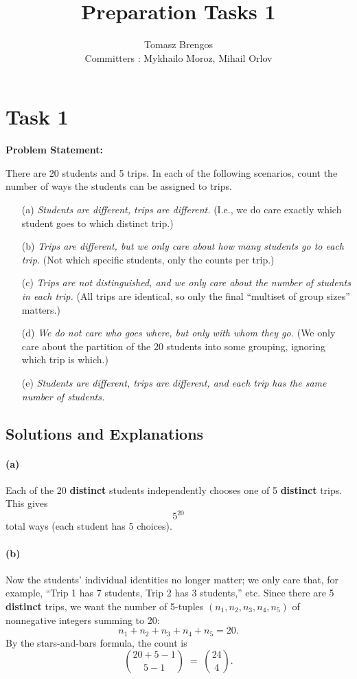 \documentclass[docmute]{article}
\title{Preparation Tasks 1}
\author{Tomasz Brengos \\  
Committers : Mykhailo Moroz, Mihail Orlov}
\date{}
\begin{document}
\maketitle

\section*{Task 1}

\textbf{Problem Statement:}

There are 20 students and 5 trips. In each of the following scenarios, count the number of ways the students can be assigned to trips.

\begin{enumerate}
  \item[(a)] \emph{Students are different, trips are different.} (I.e., we do care exactly which student goes to which distinct trip.)
  \item[(b)] \emph{Trips are different, but we only care about how many students go to each trip.} (Not which specific students, only the counts per trip.)
  \item[(c)] \emph{Trips are not distinguished, and we only care about the number of students in each trip.} (All trips are identical, so only the final ``multiset of group sizes'' matters.)
  \item[(d)] \emph{We do not care who goes where, but only with whom they go.} (We only care about the partition of the 20 students into some grouping, ignoring which trip is which.)
  \item[(e)] \emph{Students are different, trips are different, and each trip has the same number of students.}
\end{enumerate}

\subsection*{Solutions and Explanations}

\paragraph{(a)} 
Each of the 20 \textbf{distinct} students independently chooses one of 5 \textbf{distinct} trips. This gives
\[
5^{20}
\]
total ways (each student has 5 choices).

\paragraph{(b)} 
Now the students’ individual identities no longer matter; we only care that, for example, “Trip 1 has 7 students, Trip 2 has 3 students,” etc. Since there are 5 \textbf{distinct} trips, we want the number of 5-tuples \((n_1, n_2, n_3, n_4, n_5)\) of nonnegative integers summing to 20:
\[
n_1 + n_2 + n_3 + n_4 + n_5 = 20.
\]
By the stars-and-bars formula, the count is
\[
\binom{20 + 5 - 1}{5 - 1} \;=\; \binom{24}{4}.
\]
\end{document}
